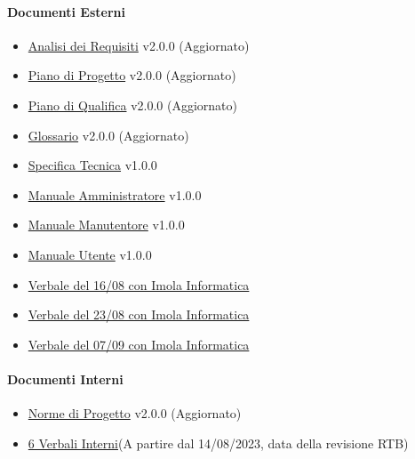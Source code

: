 \documentclass[12pt, a4paper]{article}
\begin{document}
\paragraph{Documenti Esterni}
\begin{itemize}
    \item \href{https://github.com/4ourSquared/LumosMinima/tree/main/public/esterni/analisi_dei_requisiti_v2.0.0.pdf}{Analisi dei Requisiti} v2.0.0 (Aggiornato)
    \item \href{https://github.com/4ourSquared/LumosMinima/tree/main/public/esterni/piano_di_progetto_v2.0.0.pdf}{Piano di Progetto} v2.0.0 (Aggiornato)
    \item \href{https://github.com/4ourSquared/LumosMinima/tree/main/public/esterni/piano_di_qualifica_v2.0.0.pdf}{Piano di Qualifica} v2.0.0 (Aggiornato)
    \item \href{https://github.com/4ourSquared/LumosMinima/tree/main/public/esterni/glossario_v2.0.0.pdf}{Glossario} v2.0.0 (Aggiornato)
    \item \href{https://github.com/4ourSquared/LumosMinima/tree/main/public/esterni/specifica_tecnica_v1.0.0.pdf}{Specifica Tecnica} v1.0.0
    \item \href{https://github.com/4ourSquared/LumosMinima/tree/main/public/esterni/manuale_amministratore_v1.0.0.pdf}{Manuale Amministratore} v1.0.0
    \item \href{https://github.com/4ourSquared/LumosMinima/tree/main/public/esterni/manuale_manutentore_v1.0.0.pdf}{Manuale Manutentore} v1.0.0
    \item \href{https://github.com/4ourSquared/LumosMinima/tree/main/public/esterni/manuale_utente_v1.0.0.pdf}{Manuale Utente} v1.0.0
    \item \href{https://github.com/4ourSquared/LumosMinima/tree/main/public/esterni/verbali/2023_08_16_E.pdf}{Verbale del 16/08 con Imola Informatica}
    \item \href{https://github.com/4ourSquared/LumosMinima/tree/main/public/esterni/verbali/2023_08_23_E.pdf}{Verbale del 23/08 con Imola Informatica}
    \item \href{https://github.com/4ourSquared/LumosMinima/tree/main/public/esterni/verbali/2023_09/07_E.pdf}{Verbale del 07/09 con Imola Informatica}
\end{itemize}
\paragraph{Documenti Interni}
\begin{itemize}
    \item \href{https://github.com/4ourSquared/LumosMinima/tree/main/public/interni/norme_di_progetto_v2.0.0.pdf}{Norme di Progetto} v2.0.0 (Aggiornato)
    \item \href{https://github.com/4ourSquared/LumosMinima/tree/main/public/interni/verbali}{6 Verbali Interni}(A partire dal 14/08/2023, data della revisione RTB)
\end{itemize}
\end{document}

